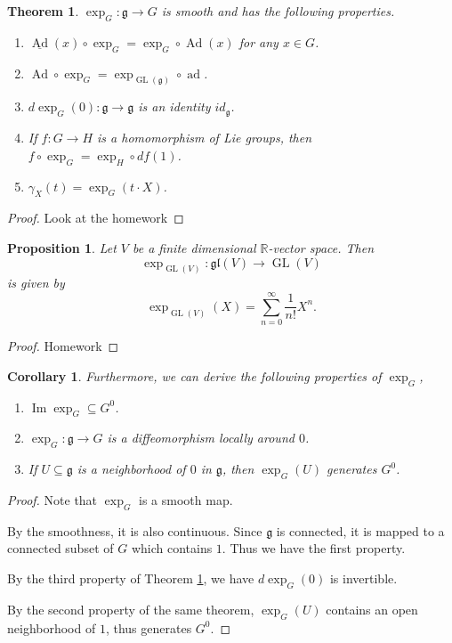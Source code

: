 \documentclass{article}
\newtheorem{theorem}{Theorem}[section]
\newtheorem{proposition}{Proposition}[section]
\newtheorem{corollary}{Corollary}[section]
\numberwithin{equation}{section}
\DeclareMathOperator{\Image}{Im}
\DeclareMathOperator{\Ad}{Ad}
\DeclareMathOperator{\ad}{ad}
\DeclareMathOperator{\GL}{GL}
\begin{document}
\begin{theorem}
$\exp_G:\mathfrak{g}\to G$ is smooth and has the following properties.
\begin{enumerate}[1).]
\item $\underline{\Ad}(x)\circ\exp_G = \exp_G\circ\Ad(x)$ for any $x\in G$.
\item $\Ad\circ\exp_G = \exp_{\GL(\mathfrak{g})}\circ\ad$.
\item $d\exp_G(0):\mathfrak{g}\to\mathfrak{g}$ is an identity $id_{\mathfrak{g}}$.
\item If $f:G\to H$ is a homomorphism of Lie groups, then $f\circ\exp_G=\exp_H\circ df(1)$. 
\item $\gamma_X(t)=\exp_G(t\cdot X)$.
\end{enumerate}
\label{exp_prop}
\end{theorem}

\begin{proof}
Look at the homework %
\end{proof}

\begin{proposition}
\label{exp_series}
Let $V$ be a finite dimensional $\mathbb{R}$-vector space. Then 
\begin{equation*}
\exp_{\GL(V)}:\mathfrak{gl}(V)\to\GL(V)
\end{equation*}
is given by 
\begin{equation*}
\exp_{\GL(V)}(X)=\sum_{n=0}^\infty{\frac 1 {n!}}X^n.
\end{equation*}
\end{proposition}

\begin{proof}
Homework%
\end{proof}

\begin{corollary}
\label{exp_prop_cor}
Furthermore, we can derive the following properties of $\exp_G$,
\begin{enumerate}[1).]
\item $\Image\exp_G\subseteq G^0$.
\item $\exp_G:\mathfrak{g}\to G$ is a diffeomorphism locally around $0$.
\item If $U\subseteq\mathfrak{g}$ is a neighborhood of $0$ in $\mathfrak{g}$, then $\exp_G(U)$ generates $G^0$.
\end{enumerate}
\end{corollary}

\begin{proof}Note that $\exp_G$ is a smooth map.\\
\par By the smoothness, it is also continuous. Since $\mathfrak{g}$ is connected, it is mapped to a connected subset of $G$ which contains $1$. Thus we have the first property.\\
\par By the third property of Theorem \ref{exp_prop}, we have $d\exp_G(0)$ is invertible.\\
\par By the second property of the same theorem, $\exp_G(U)$ contains an open neighborhood of $1$, thus generates $G^0$.
\end{proof}
\end{document}
